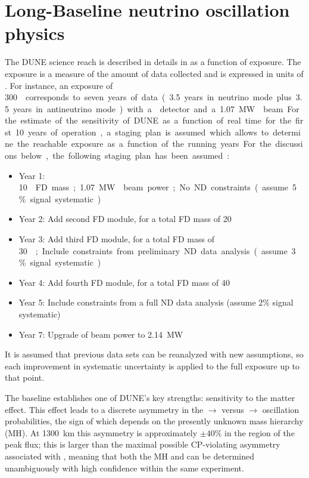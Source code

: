 \section{Long-Baseline neutrino oscillation physics}

The DUNE science reach is described in details in \volphys as a function of exposure.
The exposure is a measure of the amount of data collected and is expressed in units
of \ktMWyr{}. For instance, an exposure of \SI{300}\ktMWyr{}  
corresponds to seven years of data (\num{3.5} years in neutrino mode plus
\num{3.5} years in antineutrino mode) with a  detector and a \SI{1.07}\MW{}
beam.

For the estimate of the sensitivity of DUNE as a function of real time
for the first \num{10} years of operation, a staging plan is assumed which 
allows to determine the reachable
exposure as a function of the running years. For the discussions below,
the following staging plan has
been assumed:
\begin{itemize}
 \item Year 1: \SI{10}\kt{} FD mass; \SI{1.07}\MW{} beam power; No ND constraints (assume \num{5}\% signal systematic)
 \item Year 2: Add second  FD module, for a total FD mass of \SI{20}\kt
 \item Year 3: Add third  FD module, for a total FD mass of \SI{30}\kt; Include constraints from preliminary ND data analysis (assume \num{3}\% signal systematic)
 \item Year 4: Add fourth  FD module, for a total FD mass of \SI{40}\kt
 \item Year 5: Include constraints from a full ND data analysis (assume \num{2}\% signal systematic)
 \item Year 7: Upgrade of beam power to \SI{2.14}\MW
\end{itemize}
It is assumed that previous data sets can be reanalyzed with new
assumptions, so each improvement in systematic uncertainty is applied
to the full exposure up to that point.


The  baseline
establishes one of DUNE's key strengths: sensitivity to the matter
effect. This effect leads to a discrete asymmetry in the
\numu $\to$ \nue versus \anumu $\to$ \anue
oscillation probabilities, the sign of which depends on the presently unknown mass
hierarchy (MH).  At 1300~km this asymmetry is approximately
$\pm 40\%$ in the region of the peak flux; this is larger than the
maximal possible CP-violating asymmetry associated with \deltacp,
meaning that both the MH and \deltacp can be
determined unambiguously with high confidence within the same
experiment.

